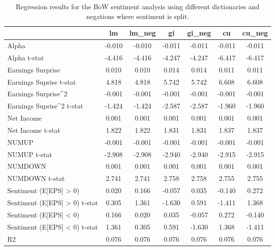 \begin{table}
\caption{Regression results for the BoW sentiment analysis using different dictionaries and negations where sentiment is split.}
\label{tab:bow_regressions_split}
\begin{tabular}{lcccccc}
\toprule
 & lm & lm_neg & gi & gi_neg & cu & cu_neg \\
\midrule
Alpha & -0.010 & -0.010 & -0.011 & -0.011 & -0.011 & -0.011 \\
Alpha t-stat & -4.416 & -4.416 & -4.247 & -4.247 & -6.417 & -6.417 \\
Earnings Surprise & 0.010 & 0.010 & 0.014 & 0.014 & 0.011 & 0.011 \\
Earnings Suprise t-stat & 4.818 & 4.818 & 5.742 & 5.742 & 6.608 & 6.608 \\
Earnings Surprise^2 & -0.001 & -0.001 & -0.001 & -0.001 & -0.001 & -0.001 \\
Earnings Suprise^2 t-stat & -1.424 & -1.424 & -2.587 & -2.587 & -1.960 & -1.960 \\
Net Income & 0.001 & 0.001 & 0.001 & 0.001 & 0.001 & 0.001 \\
Net Income t-stat & 1.822 & 1.822 & 1.831 & 1.831 & 1.837 & 1.837 \\
NUMUP & -0.001 & -0.001 & -0.001 & -0.001 & -0.001 & -0.001 \\
NUMUP t-stat & -2.908 & -2.908 & -2.940 & -2.940 & -2.915 & -2.915 \\
NUMDOWN & 0.001 & 0.001 & 0.001 & 0.001 & 0.001 & 0.001 \\
NUMDOWN t-stat & 2.741 & 2.741 & 2.758 & 2.758 & 2.755 & 2.755 \\
Sentiment (E[EPS] > 0) & 0.020 & 0.166 & -0.057 & 0.035 & -0.140 & 0.272 \\
Sentiment (E[EPS] > 0) t-stat & 0.305 & 1.361 & -1.630 & 0.591 & -1.411 & 1.368 \\
Sentiment (E[EPS] < 0) & 0.166 & 0.020 & 0.035 & -0.057 & 0.272 & -0.140 \\
Sentiment (E[EPS] < 0) t-stat & 1.361 & 0.305 & 0.591 & -1.630 & 1.368 & -1.411 \\
R2 & 0.076 & 0.076 & 0.076 & 0.076 & 0.076 & 0.076 \\
\bottomrule
\end{tabular}
\end{table}
